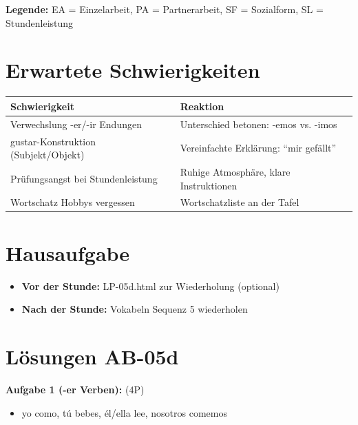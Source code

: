\documentclass[11pt,a4paper]{article}
\begin{document}
\textbf{Legende:} EA = Einzelarbeit, PA = Partnerarbeit, SF = Sozialform, SL = Stundenleistung

\section{Erwartete Schwierigkeiten}

\begin{tabular}{|p{5cm}|p{8cm}|}
\hline
\textbf{Schwierigkeit} & \textbf{Reaktion} \\
\hline
Verwechslung -er/-ir Endungen & Unterschied betonen: -emos vs. -imos \\
\hline
gustar-Konstruktion (Subjekt/Objekt) & Vereinfachte Erklärung: ``mir gefällt'' \\
\hline
Prüfungsangst bei Stundenleistung & Ruhige Atmosphäre, klare Instruktionen \\
\hline
Wortschatz Hobbys vergessen & Wortschatzliste an der Tafel \\
\hline
\end{tabular}

\section{Hausaufgabe}

\begin{itemize}
    \item \textbf{Vor der Stunde:} LP-05d.html zur Wiederholung (optional)
    \item \textbf{Nach der Stunde:} Vokabeln Sequenz 5 wiederholen
\end{itemize}

\section{Lösungen AB-05d}

\textbf{Aufgabe 1 (-er Verben):} (4P)
\begin{itemize}
    \item yo como, tú bebes, él/ella lee, nosotros comemos
\end{itemize}
\end{document}
